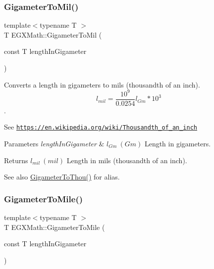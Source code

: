 \subsubsection{\texorpdfstring{Gigameter\+To\+Mil()}{GigameterToMil()}}
{\footnotesize\ttfamily template$<$typename T $>$ \\
T E\+G\+X\+Math\+::\+Gigameter\+To\+Mil (\begin{DoxyParamCaption}\item[{const T}]{length\+In\+Gigameter }\end{DoxyParamCaption})}



Converts a length in gigameters to mils (thousandth of an inch). \[ l_{mil}= \frac{10^{9}}{0.0254} l_{Gm} * 10^{3} \]. 

See \href{https://en.wikipedia.org/wiki/Thousandth_of_an_inch}{\tt https\+://en.\+wikipedia.\+org/wiki/\+Thousandth\+\_\+of\+\_\+an\+\_\+inch} 
\begin{DoxyParams}{Parameters}
{\em length\+In\+Gigameter} & $ l_{Gm}\ (Gm)$ Length in gigameters. \\
\hline
\end{DoxyParams}
\begin{DoxyReturn}{Returns}
$ l_{mil}\ (mil)$ Length in mils (thousandth of an inch). 
\end{DoxyReturn}
\begin{DoxySeeAlso}{See also}
\mbox{\hyperlink{group___e_g_x_math-_conversions-_length_conversions-_s_i-_gigameter-_imperial_ga94fd906264f882396dc438a684e22b41}{Gigameter\+To\+Thou()}} for alias. 
\end{DoxySeeAlso}
\mbox{\label{group___e_g_x_math-_conversions-_length_conversions-_s_i-_gigameter-_imperial_gab61b3324bc2080e5118924bffdd0d46d}} 
\subsubsection{\texorpdfstring{Gigameter\+To\+Mile()}{GigameterToMile()}}
{\footnotesize\ttfamily template$<$typename T $>$ \\
T E\+G\+X\+Math\+::\+Gigameter\+To\+Mile (\begin{DoxyParamCaption}\item[{const T}]{length\+In\+Gigameter }\end{DoxyParamCaption})}



